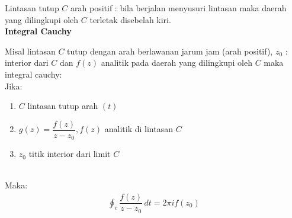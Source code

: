 \documentclass{article}
\begin{document}
    Lintasan tutup $C$ arah positif : bila berjalan menyusuri lintasan maka daerah yang dilingkupi oleh $C$ terletak disebelah kiri.
    \leavevmode\\

    \newpage
    \textbf{Integral Cauchy}

    Misal lintasan $C$ tutup dengan arah berlawanan jarum jam (arah positif),  $z_0$ : interior dari $C$ dan $f(z)$ analitik pada daerah yang dilingkupi oleh $C$ maka integral cauchy:
    \leavevmode\\

    Jika:
    \begin{enumerate}
        \item $C$ lintasan tutup arah $(t)$
        \item $g(z) = \dfrac{f(z)}{z-z_0} , f(z)$ analitik di lintasan $C$
        \item $z_0$ titik interior dari limit $C$
    \end{enumerate}
    \leavevmode\\

    Maka:
    \begin{align}
        \oint_{c}^{} \dfrac{f(z)}{z-z_0} \,dt = 2\pi i f(z_0)
        \nonumber
    \end{align}
\end{document}
